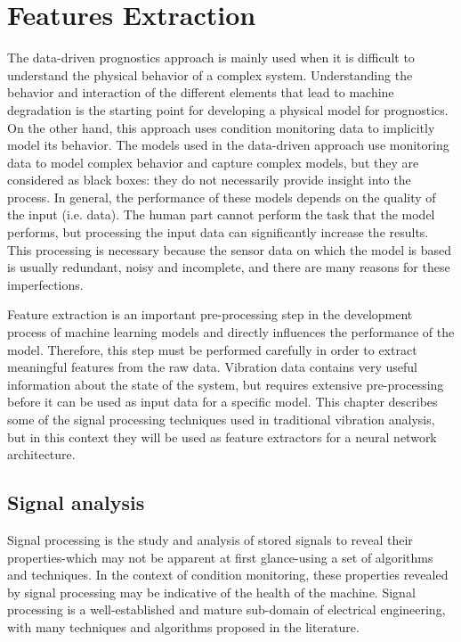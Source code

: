 \section{Features Extraction}
The data-driven prognostics approach is mainly used when it is difficult to understand the physical behavior of a complex system. Understanding the behavior and interaction of the different elements that lead to machine degradation is the starting point for developing a physical model for prognostics.
On the other hand, this approach uses condition monitoring data to implicitly model its behavior. The models used in the data-driven approach use monitoring data to model complex behavior and capture complex models, but they are considered as black boxes: they do not necessarily provide insight into the process.
In general, the performance of these models depends on the quality of the input (i.e. data). The human part cannot perform the task that the model performs, but processing the input data can significantly increase the results. This processing is necessary because the sensor data on which the model is based is usually redundant, noisy and incomplete, and there are many reasons for these imperfections.

Feature extraction is an important pre-processing step in the development process of machine learning models and directly influences the performance of the model. Therefore, this step must be performed carefully in order to extract meaningful features from the raw data. Vibration data contains very useful information about the state of the system, but requires extensive pre-processing before it can be used as input data for a specific model. This chapter describes some of the signal processing techniques used in traditional vibration analysis, but in this context they will be used as feature extractors for a neural network architecture.

\subsection{Signal analysis}
Signal processing is the study and analysis of stored signals to reveal their properties-which may not be apparent at first glance-using a set of algorithms and techniques. In the context of condition monitoring, these properties revealed by signal processing may be indicative of the health of the machine.
Signal processing is a well-established and mature sub-domain of electrical engineering, with many techniques and algorithms proposed in the literature.

